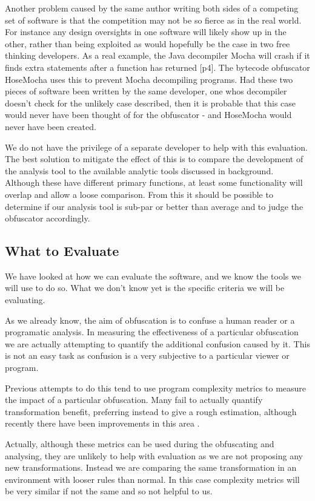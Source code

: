 \documentclass{report}
\begin{document}
Another problem caused by the same author writing both sides of a competing set of software is that the competition
may not be so fierce as in the real world. For instance any design oversights in one software will likely show up
in the other, rather than being exploited as would hopefully be the case in two free thinking developers. As a real
example, the Java decompiler Mocha will crash if it finds extra statements after a function has returned
\cite{hosemocha}[p4]. The bytecode obfuscator HoseMocha uses this to prevent Mocha decompiling programs. Had these two
pieces of software been written by the same developer, one whos decompiler doesn't check for the unlikely case described,
then it is probable that this case would never have been thought of for the obfuscator - and HoseMocha would never have
been created.

We do not have the privilege of a separate developer to help with this evaluation. The best solution to mitigate the effect
of this is to compare the development of the analysis tool to the available analytic tools discussed in background. Although
these have different primary functions, at least some functionality will overlap and allow a loose comparison. From this it
should be possible to determine if our analysis tool is sub-par or better than average and to judge the obfuscator
accordingly.

\subsection{What to Evaluate}

We have looked at how we can evaluate the software, and we know the tools we will use to do so. What we don't know yet is
the specific criteria we will be evaluating. 

As we already know, the aim of obfuscation is to confuse a human reader or a programatic analysis. In measuring the effectiveness
of a particular obfuscation we are actually attempting to quantify the additional confusion caused by it. This is not an easy task
as confusion is a very subjective to a particular viewer or program.

Previous attempts to do this tend to use program complexity metrics to measure the impact of a particular obfuscation. Many fail to
actually quantify transformation benefit, preferring instead to give a rough estimation, although recently there have been improvements in
this area \cite{obfquant}.

Actually, although these metrics can be used during the obfuscating and analysing, they are unlikely to help with evaluation as we are
not proposing any new transformations. Instead we are comparing the same transformation in an environment with looser rules than normal.
In this case complexity metrics will be very similar if not the same and so not helpful to us.
\end{document}

